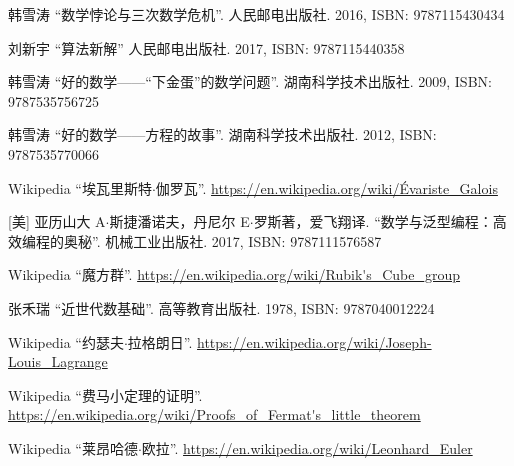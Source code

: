 \documentclass{article}
\begin{document}
\ifx\wholebook\relax \else
\begin{thebibliography}{99}

韩雪涛 ``数学悖论与三次数学危机''. 人民邮电出版社. 2016, ISBN: 9787115430434

刘新宇 ``算法新解'' 人民邮电出版社. 2017, ISBN: 9787115440358

韩雪涛 ``好的数学——“下金蛋”的数学问题''. 湖南科学技术出版社. 2009, ISBN: 9787535756725

韩雪涛 ``好的数学——方程的故事''. 湖南科学技术出版社. 2012, ISBN: 9787535770066

Wikipedia ``埃瓦里斯特$\cdot$伽罗瓦''. \url{https://en.wikipedia.org/wiki/Évariste_Galois}

[美] 亚历山大 A$\cdot$斯捷潘诺夫，丹尼尔 E$\cdot$罗斯著，爱飞翔译. ``数学与泛型编程：高效编程的奥秘''. 机械工业出版社. 2017, ISBN: 9787111576587

Wikipedia ``魔方群''. \url{https://en.wikipedia.org/wiki/Rubik's_Cube_group}

张禾瑞 ``近世代数基础''. 高等教育出版社. 1978, ISBN: 9787040012224

Wikipedia ``约瑟夫$\cdot$拉格朗日''. \url{https://en.wikipedia.org/wiki/Joseph-Louis_Lagrange}

Wikipedia ``费马小定理的证明''. \url{https://en.wikipedia.org/wiki/Proofs_of_Fermat's_little_theorem}

Wikipedia ``莱昂哈德$\cdot$欧拉''. \url{https://en.wikipedia.org/wiki/Leonhard_Euler}



\end{thebibliography}

\expandafter\enddocument

\fi
\end{document}
